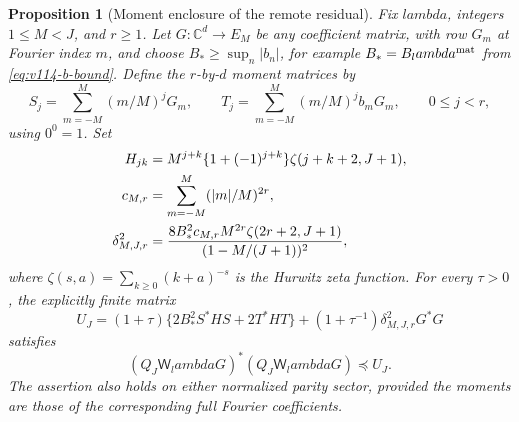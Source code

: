 \documentclass[11pt]{article}
\def\lambda{lambda}%
\newtheorem{proposition}[theorem]{Proposition}
\theoremstyle{remark}
\begin{document}
\begin{proposition}[Moment enclosure of the remote residual]
\label{prop:v116-remote-moment}
Fix $\lambda$, integers $1\le M<J$, and $r\ge1$.  Let
$G:\mathbb C^d\to E_M$ be any coefficient matrix, with row $G_m$ at
Fourier index $m$, and choose $B_*\ge\sup_n|b_n|$, for example
$B_*=B_\lambda^{\rm mat}$ from \eqref{eq:v114-b-bound}.
Define the $r$-by-$d$ moment matrices by
\begin{equation}\label{eq:v116-moments}
 S_j=\sum_{m=-M}^M(m/M)^jG_m,\qquad
 T_j=\sum_{m=-M}^M(m/M)^j b_mG_m,
 \qquad 0\le j<r,
\end{equation}
using $0^0=1$.  Set
\begin{align}
 H_{jk}&=M^{j+k}\{1+(-1)^{j+k}\}
                  \zeta(j+k+2,J+1),\notag\\
 c_{M,r}&=\sum_{m=-M}^M(|m|/M)^{2r},\notag\\
 \delta_{M,J,r}^{2}
 &=\frac{8B_*^2c_{M,r}M^{2r}\zeta(2r+2,J+1)}
                    {(1-M/(J+1))^2},
 \label{eq:v116-moment-constants}
\end{align}
where $\zeta(s,a)=\sum_{k\ge0}(k+a)^{-s}$ is the Hurwitz zeta
function.  For every $\tau>0$, the explicitly finite matrix
\begin{equation}\label{eq:v116-remote-bound}
 U_J=(1+\tau)\{2B_*^2S^*HS+2T^*HT\}
       +(1+\tau^{-1})\delta_{M,J,r}^{2}G^*G
\end{equation}
satisfies
\[
 (Q_J\mathsf W_\lambda G)^*(Q_J\mathsf W_\lambda G)\preceq U_J.
\]
The assertion also holds on either normalized parity sector, provided
the moments are those of the corresponding full Fourier coefficients.
\end{proposition}
\end{document}
